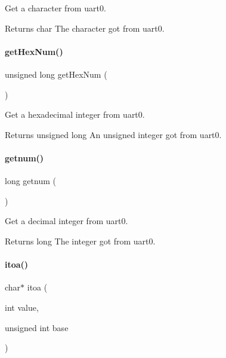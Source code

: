 Get a character from uart0. 

\begin{DoxyReturn}{Returns}
char The character got from uart0. 
\end{DoxyReturn}
\mbox{\label{a00026_af48103646b7cb053e55eb3867a05fc85}} 
\paragraph{\texorpdfstring{get\+Hex\+Num()}{getHexNum()}}
{\footnotesize\ttfamily unsigned long get\+Hex\+Num (\begin{DoxyParamCaption}{ }\end{DoxyParamCaption})}



Get a hexadecimal integer from uart0. 

\begin{DoxyReturn}{Returns}
unsigned long An unsigned integer got from uart0. 
\end{DoxyReturn}
\mbox{\label{a00026_a46d9f17d80612d1174eab96f53c7c5b7}} 
\paragraph{\texorpdfstring{getnum()}{getnum()}}
{\footnotesize\ttfamily long getnum (\begin{DoxyParamCaption}{ }\end{DoxyParamCaption})}



Get a decimal integer from uart0. 

\begin{DoxyReturn}{Returns}
long The integer got from uart0. 
\end{DoxyReturn}
\mbox{\label{a00026_ac399b37e5355c704e130b1c6f60b71ec}} 
\paragraph{\texorpdfstring{itoa()}{itoa()}}
{\footnotesize\ttfamily char$\ast$ itoa (\begin{DoxyParamCaption}\item[{int}]{value,  }\item[{unsigned int}]{base }\end{DoxyParamCaption})}



